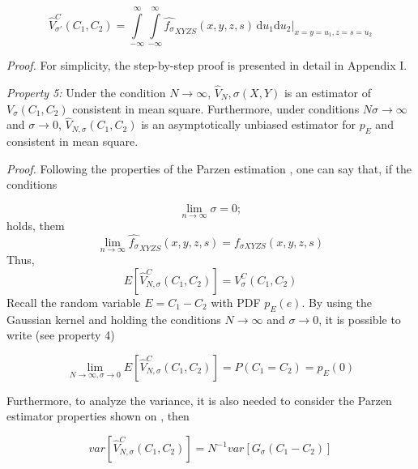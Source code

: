 \documentclass[preprint,12pt]{elsarticle}
\begin{document}
\begin{equation}
\hat{V}^{C}_{\sigma'}(C_1,C_2) = \int\limits_{-\infty}^{\infty} \int\limits_{-\infty}^{\infty}  \! \hat{f_{\sigma}}_{XYZS}(x,y,z,s) \, \mathrm{d}u_{1}\mathrm{d}u_{2} \Big|_{x=y=u_{1}, z=s=u_{2}} 
\end{equation}


\textit{Proof.} For simplicity, the step-by-step proof is presented in detail in Appendix I.

\bigskip
\textit{Property 5:} Under the condition $N \rightarrow \infty$, $\hat{V}_N,\sigma(X,Y)$ is an estimator of $V_\sigma(C_1,C_2)$ consistent in mean square. Furthermore, under conditions $N\sigma \rightarrow \infty$ and $\sigma \rightarrow 0$, $\hat{V}_{N,\sigma}(C_1,C_2)$ is an asymptotically unbiased estimator for $p_E$ and consistent in mean square. 


\textit{Proof.} Following the properties of the Parzen estimation \citep{parzen1962estimation}, one can say that, if the conditions


\begin{equation}
\lim_{n \rightarrow \infty} \sigma = 0;
\end{equation}
holds, them
\begin{equation}
\lim_{n \rightarrow \infty} \hat{f_{\sigma}}_{XYZS}(x,y,z,s) = f_{\sigma XYZS}(x,y,z,s)
\end{equation}
Thus, 
\begin{equation}
E[\hat{V}^C_{N,\sigma}(C_1,C_2) ] = V^C_\sigma (C_1,C_2)
\end{equation}
Recall the random variable $E = C_1 - C_2$ with PDF $p_E(e)$. By using the Gaussian kernel and holding the conditions $N \rightarrow \infty $ and $\sigma \rightarrow 0$, it is possible to write (see property 4)




\begin{equation}
\lim_{N \rightarrow \infty, \sigma \rightarrow 0} E[\hat{V}^C_{N,\sigma}(C_1,C_2) ] = P(C_1 = C_2) = p_E(0)
\end{equation}



Furthermore, to analyze the variance, it is also needed to consider the Parzen estimator properties shown on \citep{parzen1962estimation}, then

\begin{equation}
var[\hat{V}^C_{N,\sigma}(C_1,C_2) ] = N^{-1} var[G_{\sigma}(C_1 - C_2)]
\end{equation}
\end{document}

